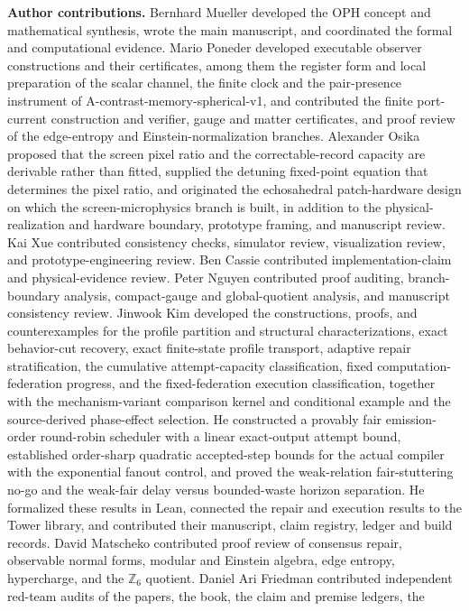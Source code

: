\documentclass[11pt]{article}
\theoremstyle{definition}
\theoremstyle{remark}
\begin{document}
\noindent\textbf{Author contributions.}
Bernhard Mueller developed the OPH concept and mathematical synthesis, wrote
the main manuscript, and coordinated the formal and computational evidence.
Mario Poneder developed executable observer constructions and their
certificates, among them the register form and local preparation of the
scalar channel, the finite clock and the pair-presence instrument of
A-contrast-memory-spherical-v1, and contributed the
finite port-current construction and verifier, gauge and matter certificates,
and proof review of the edge-entropy and Einstein-normalization branches. Alexander Osika proposed that the screen pixel ratio and the
correctable-record capacity are derivable rather than fitted, supplied the
detuning fixed-point equation that determines the pixel ratio, and originated
the echosahedral patch-hardware design on which the screen-microphysics branch
is built, in addition to the physical-realization and hardware boundary,
prototype framing, and manuscript review. Kai
Xue contributed consistency checks, simulator review, visualization review,
and prototype-engineering review. Ben Cassie contributed implementation-claim
and physical-evidence review. Peter Nguyen contributed proof auditing,
branch-boundary analysis, compact-gauge and global-quotient analysis, and
manuscript consistency review. Jinwook Kim developed the constructions,
proofs, and counterexamples for the profile partition and structural
characterizations, exact behavior-cut recovery, exact finite-state profile
transport, adaptive repair stratification, the cumulative attempt-capacity
classification, fixed computation-federation progress, and the
fixed-federation execution classification, together with the
mechanism-variant comparison kernel and conditional example and the
source-derived phase-effect selection. He constructed a provably fair
emission-order round-robin scheduler with a linear exact-output attempt bound,
established order-sharp quadratic accepted-step bounds for the actual compiler
with the exponential fanout control, and proved the weak-relation
fair-stuttering no-go and the weak-fair delay versus bounded-waste horizon
separation. He formalized these results in Lean, connected the repair and
execution results to the Tower library, and contributed their manuscript, claim registry, ledger and build records. David Matscheko contributed proof review of
consensus repair, observable normal forms, modular and Einstein algebra,
edge entropy, hypercharge, and the $\mathbb Z_6$ quotient. Daniel Ari Friedman contributed independent
red-team audits of the papers, the book, the claim and premise ledgers, the
\end{document}
